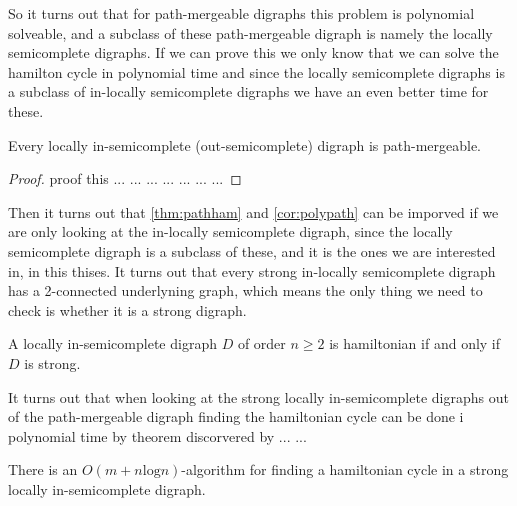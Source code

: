 So it turns out that for path-mergeable digraphs this problem is polynomial solveable, and a subclass of these path-mergeable digraph is namely the locally semicomplete digraphs. If we can prove this we only know that we can solve the hamilton cycle in polynomial time and since the locally semicomplete digraphs is a subclass of in-locally semicomplete digraphs we have an even better time for these.
\begin{prop}
    Every locally in-semicomplete (out-semicomplete) digraph is path-mergeable.
\end{prop}
\begin{proof}
    proof this ... ... ... ... ... ... ... 
\end{proof}

Then it turns out that \autoref{thm:pathham} and \autoref{cor:polypath} can be imporved if we are only looking at the in-locally semicomplete digraph, since the locally semicomplete digraph is a subclass of these, and it is the ones we are interested in, in this thises. It turns out that every strong in-locally semicomplete digraph has a 2-connected underlyning graph, which means the only thing we need to check is whether it is a strong digraph.
\begin{thm}
    A locally in-semicomplete digraph $D$ of order $n\geq 2$ is hamiltonian if and only if $D$ is strong.
\end{thm}

It turns out that when looking at the strong locally in-semicomplete digraphs out of the path-mergeable digraph finding the hamiltonian cycle can be done i polynomial time by theorem discorvered by ... ...
\begin{thm}
    There is an $O(m+n\text{log}n)$-algorithm for finding a hamiltonian cycle in a strong locally in-semicomplete digraph.
\end{thm}

